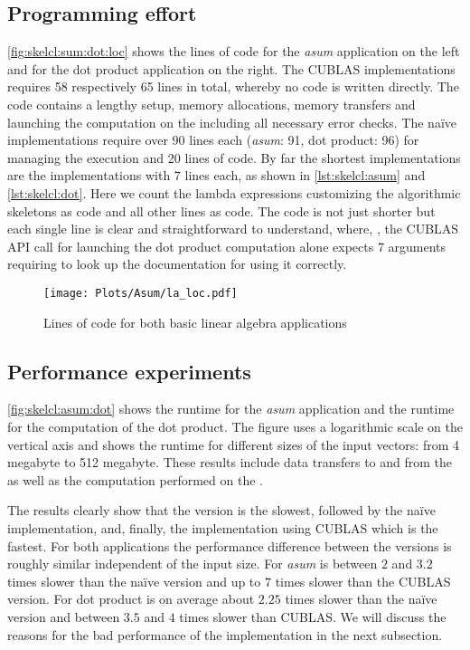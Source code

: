 \subsection*{Programming effort}
\autoref{fig:skelcl:sum:dot:loc} shows the lines of code for the \emph{asum} application on the left and for the dot product application on the right.
The CUBLAS implementations requires 58 respectively 65 lines in total, whereby no \GPU code is written directly.
The code contains a lengthy setup, memory allocations, memory transfers and launching the computation on the \GPU including all necessary error checks.
The na{\"i}ve \OpenCL implementations require over 90 lines each (\emph{asum}: 91, dot product: 96) for managing the \GPU execution and 20 lines of \GPU code.
By far the shortest implementations are the \SkelCL implementations with 7 lines each, as shown in \autoref{lst:skelcl:asum} and \autoref{lst:skelcl:dot}.
Here we count the lambda expressions customizing the algorithmic skeletons as \GPU code and all other lines as \CPU code.
The code is not just shorter but each single line is clear and straightforward to understand, where, \eg,  the CUBLAS API call for launching the dot product computation alone expects 7 arguments requiring to look up the documentation for using it correctly.

\begin{figure}
  \centering
  \texttt{[image: Plots/Asum/la\_loc.pdf]}
  \caption[Lines of code for two basic linear algebra applications]{Lines of code for both basic linear algebra applications}
  \label{fig:skelcl:sum:dot:loc}
\end{figure}

\subsection*{Performance experiments}
\autoref{fig:skelcl:asum:dot} shows the runtime for the \emph{asum} application and the runtime for the computation of the dot product.
The figure uses a logarithmic scale on the vertical axis and shows the runtime for different sizes of the input vectors: from 4 megabyte to 512 megabyte.
These results include data transfers to and from the \GPU as well as the computation performed on the \GPU.

The results clearly show that the \SkelCL version is the slowest, followed by the na{\"i}ve \OpenCL implementation, and, finally, the implementation using CUBLAS which is the fastest.
For both applications the performance difference between the versions is roughly similar independent of the input size.
For \emph{asum} \SkelCL is between $2$ and $3.2$ times slower than the na{\"i}ve \OpenCL version and up to $7$ times slower than the CUBLAS version.
For dot product \SkelCL is on average about $2.25$ times slower than the na{\"i}ve \OpenCL version and between $3.5$ and $4$ times slower than CUBLAS.
We will discuss the reasons for the bad performance of the \SkelCL implementation in the next subsection.

